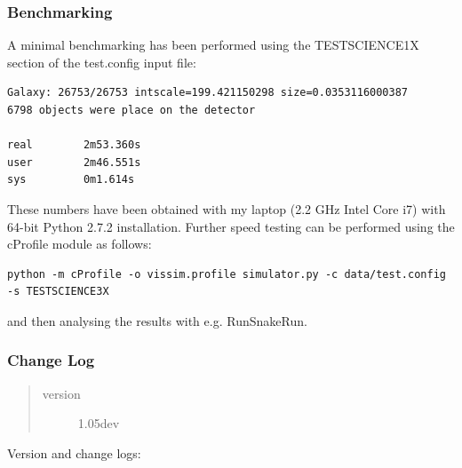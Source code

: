 \documentclass[a4paper,12pt,english]{sphinxmanual}
\begin{document}
\subsubsection{Benchmarking}
\label{simulator:benchmarking}
A minimal benchmarking has been performed using the TESTSCIENCE1X section of the test.config input file:

\begin{Verbatim}[commandchars=\\\{\}]
Galaxy: 26753/26753 intscale=199.421150298 size=0.0353116000387
6798 objects were place on the detector

real        2m53.360s
user        2m46.551s
sys         0m1.614s
\end{Verbatim}

These numbers have been obtained with my laptop (2.2 GHz Intel Core i7) with
64-bit Python 2.7.2 installation. Further speed testing can be performed using the cProfile module
as follows:

\begin{Verbatim}[commandchars=\\\{\}]
python -m cProfile -o vissim.profile simulator.py -c data/test.config -s TESTSCIENCE3X
\end{Verbatim}

and then analysing the results with e.g. RunSnakeRun.


\subsubsection{Change Log}
\label{simulator:change-log}\begin{quote}\begin{description}
\item[{version}] \leavevmode
1.05dev

\end{description}\end{quote}

Version and change logs:
\end{document}
